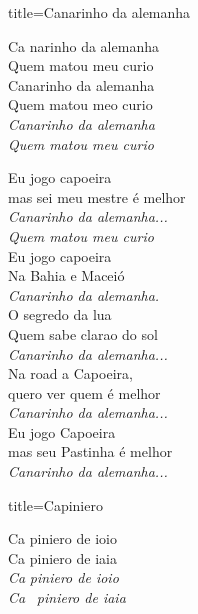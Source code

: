 \documentclass[fontsize=14pt, paper=a4, twoside, DIV=20]{scrreprt} %
\begin{document}
\begin{multicols*}{2}

\begin{song}{title={Canarinho da alemanha}}
    \begin{chorus*}
            Ca narinho da alemanha\\
            Quem matou meu curio\\
            Canarinho da alemanha\\
            Quem matou meo curio\\
            \textit{Canarinho da alemanha}\\
            \textit{Quem matou meu curio}
    \end{chorus*}
        \begin{verse*}
            Eu jogo capoeira\\
            mas sei meu mestre é melhor\\
            \textit{Canarinho da alemanha...}\\
            \textit{Quem matou meu curio}\\
            Eu jogo capoeira\\
            Na Bahia e Maceió\\
            \textit{Canarinho da alemanha.}\\
            O segredo da lua\\
            Quem sabe clarao do sol\\
            \textit{Canarinho da alemanha...}\\
            Na road a Capoeira,\\
            quero ver quem é melhor\\
            \textit{Canarinho da alemanha...}\\
            Eu jogo Capoeira\\
            mas seu Pastinha é melhor\\
            \textit{Canarinho da alemanha...}\\
        \end{verse*}
\end{song}
\begin{song}{title={Capiniero}}
        \begin{verse*}
            Ca piniero de ioio\\
            Ca piniero de iaia\\
            \textit{Ca} \textit{piniero de ioio}\\
            \textit{Ca} \ \textit{piniero de iaia}\\

\end{verse*}
\end{song}
\end{multicols*}
\end{document}
